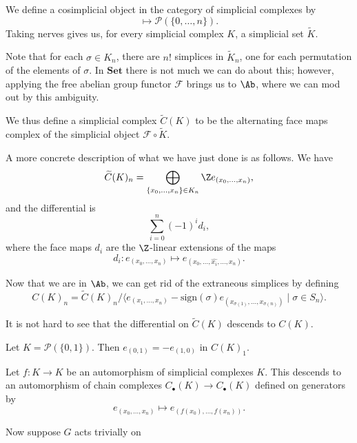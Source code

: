 \documentclass[main.tex]{subfiles}
\begin{document}
We define a cosimplicial object in the category of simplicial complexes by
\begin{equation*}
  [n] \mapsto \mathcal{P}(\{0, \ldots, n\}).
\end{equation*}
Taking nerves gives us, for every simplicial complex $K$, a simplicial set $\tilde{K}$.

Note that for each $\sigma \in K_{n}$, there are $n!$ simplices in $\tilde{K}_{n}$, one for each permutation of the elements of $\sigma$. In $\mathbf{Set}$ there is not much we can do about this; however, applying the free abelian group functor $\mathcal{F}$ brings us to $\Ab$, where we can mod out by this ambiguity.

We thus define a simplicial complex $\widetilde{C}(K)$ to be the alternating face maps complex of the simplicial object $\mathcal{F} \circ \tilde{K}$.

A more concrete description of what we have just done is as follows. We have
\begin{equation*}
  \widetilde{C}(K)_{n} = \bigoplus_{\{x_{0}, \ldots, x_{n}\} \in K_{n}} \Z e_{(x_{0}, \ldots, x_{n})},
\end{equation*}
and the differential is
\begin{equation*}
  \sum_{i = 0}^{n} (-1)^{i} d_{i},
\end{equation*}
where the face maps $d_{i}$ are the $\Z$-linear extensions of the maps
\begin{equation*}
  d_{i}\colon e_{(x_{0}, \ldots, x_{n})} \mapsto e_{(x_{0}, \ldots, \widehat{x_{i}}, \ldots, x_{n})}.
\end{equation*}

Now that we are in $\Ab$, we can get rid of the extraneous simplices by defining
\begin{equation*}
  C(K)_{n} = \widetilde{C}(K)_{n}/\langle e_{(x_{1}, \ldots, x_{n})} - \mathrm{sign}(\sigma) e_{(x_{\sigma(1)}, \ldots, x_{\sigma(n)})} \mid \sigma \in S_{n}\rangle.
\end{equation*}

It is not hard to see that the differential on $\widetilde{C}(K)$ descends to $C(K)$.

\begin{example}
  Let $K = \mathcal{P}(\{0, 1\})$. Then $e_{(0, 1)} = -e_{(1, 0)}$ in $C(K)_{1}$.
\end{example}

Let $f\colon K \to K$ be an automorphism of simplicial complexes $K$. This descends to an automorphism of chain complexes $C_{\bullet}(K) \to C_{\bullet}(K)$ defined on generators by
\begin{equation*}
  e_{(x_{0}, \ldots, x_{n})} \mapsto e_{(f(x_{0}), \ldots, f(x_{n}))}.
\end{equation*}

Now suppose $G$ acts trivially on
\end{document}
